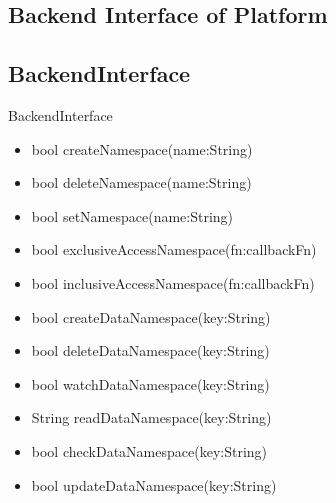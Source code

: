 \documentclass{beamer}
\newcommand{\drawLinkArrow}[4]{
		\pgfmathparse{2pt+3.5pt}
	\draw[->] let
		\p1 = (#1), \p2 = (#2),
		\p3 = (#3), \p4 = (#4)
		in
		({(\x1 + \x2)*1/2} ,\y1) -- ({(\x3 + \x4)*1/2} ,\y4);
}
\begin{document}
\subsection {Backend Interface of Platform}
\begin{frame}
\end{frame}


\subsection {BackendInterface}
\begin{frame}
\begin{block}{BackendInterface}
		\begin{itemize}
			\item bool \alert{createNamespace}(name:String)
			\item bool \alert{deleteNamespace}(name:String)
			\item bool \alert{setNamespace}(name:String)
			\item bool \alert{exclusiveAccessNamespace}(fn:callbackFn)
			\item bool \alert{inclusiveAccessNamespace}(fn:callbackFn)
			\item bool \alert{createDataNamespace}(key:String)
			\item bool \alert{deleteDataNamespace}(key:String)
			\item bool \alert{watchDataNamespace}(key:String)
			\item String \alert{readDataNamespace}(key:String)
			\item bool \alert{checkDataNamespace}(key:String)
			\item bool \alert{updateDataNamespace}(key:String)
		\end{itemize}
	\end{block}

\end{frame}
\end{document}
